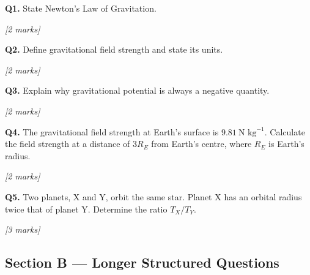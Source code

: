 \begin{tcolorbox}[colback=white, colframe=midblue, breakable]

\begin{minipage}{\linewidth}
\textbf{Q1.} State Newton's Law of Gravitation.
\par\hfill\textit{[2 marks]}
\vspace{2.5cm}
\end{minipage}

\begin{minipage}{\linewidth}
\textbf{Q2.} Define gravitational field strength and state its units.
\par\hfill\textit{[2 marks]}
\vspace{2.5cm}
\end{minipage}

\begin{minipage}{\linewidth}
\textbf{Q3.} Explain why gravitational potential is always a negative quantity.
\par\hfill\textit{[2 marks]}
\vspace{3cm}
\end{minipage}

\begin{minipage}{\linewidth}
\textbf{Q4.} The gravitational field strength at Earth's surface is $9.81\ \text{N kg}^{-1}$. Calculate the field strength at a distance of $3R_E$ from Earth's centre, where $R_E$ is Earth's radius.
\par\hfill\textit{[2 marks]}
\vspace{3cm}
\end{minipage}

\begin{minipage}{\linewidth}
\textbf{Q5.} Two planets, X and Y, orbit the same star. Planet X has an orbital radius twice that of planet Y. Determine the ratio $T_X / T_Y$.
\par\hfill\textit{[3 marks]}
\vspace{3.5cm}
\end{minipage}

\end{tcolorbox}

\subsection*{Section B — Longer Structured Questions}

